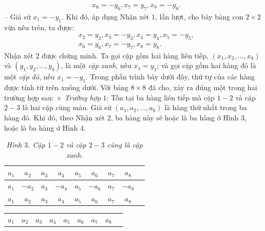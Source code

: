 \begin{multicols}{2}
\begin{align*}
		&x_6 = -y_6, x_7 = y_7, x_8 = -y_8.
	\end{align*}
	-- Giả sử  $x_1 = -y_1$. Khi đó, áp dụng Nhận xét $1$, lần lượt, cho bảy bảng con $2 \times  2$ vừa nêu trên, ta được:
	\begin{align*}
		&x_2 = y_2, x_3 = -y_3, x_4 = y_4, x_5 = -y_5,\\
		&x_6 = y_6, x_7 = -y_7, x_8 = y_8.
	\end{align*}
	Nhận xét $2$ được chứng minh.
	\vskip 0.05cm
	Ta gọi cặp gồm hai hàng liên tiếp,  $\left( {{x_1},{x_2}, \ldots ,{x_8}} \right)$ và  $\left( {{y_1},{y_2}, \ldots ,{y_8}} \right)$, là một \textit{cặp xanh}, nếu  $x_1 = y_1$; và gọi cặp gồm hai hàng đó là một \textit{cặp đỏ}, nếu  $x_1 = -y_1$.
	\vskip 0.05cm
	Trong phần trình bày dưới đây, thứ tự của các hàng được tính từ trên xuống dưới.
	\vskip 0.05cm
	Với bảng $8 \times  8$ đã cho, xảy ra đúng một trong hai trường hợp sau:
	\vskip 0.05cm
	$\diamond$ \textit{Trường hợp} $1$: Tồn tại ba hàng liên tiếp mà cặp $1 - 2$ và cặp $2 - 3$ là hai cặp cùng màu.
	\vskip 0.05cm
	Giả sử $\left( {{a_1},{a_2}, \ldots ,{a_8}} \right)$  là hàng thứ nhất trong ba hàng đó. Khi đó, theo Nhận xét $2$, ba hàng này sẽ hoặc là ba hàng ở Hình $3$, hoặc là ba hàng ở Hình $4$.
	\begin{table}[H]
		\vspace*{-5pt}
		\centering
		\captionsetup{labelformat= empty, justification=centering}
		\renewcommand{\arraystretch}{1.2}
		\setlength{\tabcolsep}{4.5pt}
		\begin{tabular}{|c|c|c|c|c|c|c|c|c|}
			\hline
			$a_1$ & $a_2$ & $a_3$ & $a_4$ & $a_5$ & $a_6$ & $a_7$ & $a_8$ \\
			\hline
			$a_1$ & $-a_2$ & $a_3$ & $-a_4$ & $a_5$ & $-a_6$ & $a_7$ & $-a_8$ \\
			\hline
			$a_1$ & $a_2$ & $a_3$ & $a_4$ & $a_5$ & $a_6$ & $a_7$ & $a_8$ \\
			\hline
		\end{tabular}
		\caption{\small\textit{\color{thachthuctoanhoc}Hình $3$. Cặp $1 - 2$ và cặp $2 - 3$ cùng là cặp xanh.}}
		\vspace*{-10pt}
	\end{table}
	\begin{table}[H]
		\vspace*{-5pt}
		\centering
		\captionsetup{labelformat= empty, justification=centering}
		\renewcommand{\arraystretch}{1.2}
		\setlength{\tabcolsep}{4.5pt}
		\begin{tabular}{|c|c|c|c|c|c|c|c|c|}
			\hline
			$a_1$ & $a_2$ & $a_3$ & $a_4$ & $a_5$ & $a_6$ & $a_7$ & $a_8$ \\

\end{tabular}
\end{table}
\end{multicols}
